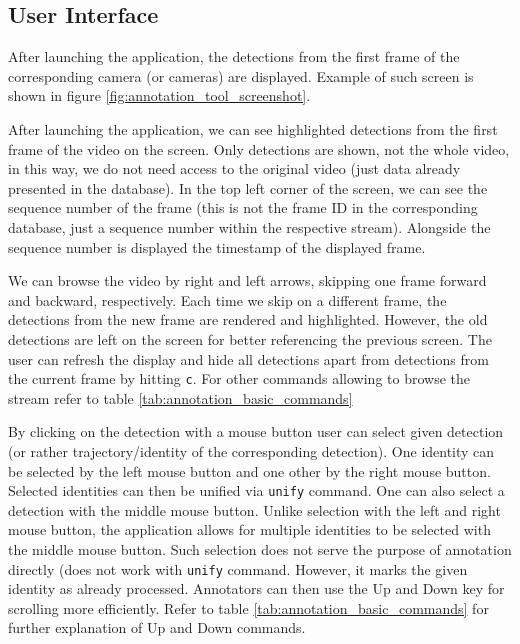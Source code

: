 \subsection{User Interface}

After launching the application, the detections from the first frame of the corresponding
camera (or cameras) are displayed. Example of such screen is shown in figure
\ref{fig:annotation_tool_screenshot}.


After launching the application, we can see highlighted detections from
the first frame of the video on the screen.
Only detections are shown, not the whole video, in this way, we do not need access
to the original video (just data already presented in the database). In the top left corner
of the screen, we can see the sequence number of the frame (this is not the frame ID
in the corresponding database, just a sequence number within the respective stream). Alongside
the sequence number is displayed the timestamp of the displayed frame.

We can browse the video by right and left arrows, skipping one frame forward and
backward, respectively. Each time we skip on a different frame, the detections from
the new frame are rendered and highlighted. However, the old detections are left
on the screen for better referencing the previous screen. The user can refresh the display
and hide all detections apart from detections from the current frame by hitting \verb+c+.
For other commands allowing to browse the stream refer to table
\ref{tab:annotation_basic_commands}

By clicking on the detection with a mouse button user can select given detection (or rather trajectory/identity of the corresponding detection). One identity can be selected
by the left mouse button and one other by the right mouse button. Selected identities can then be unified via \verb+unify+ command. One can also select a detection with the
middle mouse button. Unlike selection with the left and right mouse button, the application
allows for multiple identities to be selected with the middle mouse button. Such selection
does not serve the purpose of annotation directly (does not work with \verb+unify+ command.
However, it marks the given identity as already processed. Annotators can then use the Up and Down key for scrolling more efficiently. Refer to table 
\ref{tab:annotation_basic_commands} for further explanation of Up and Down commands.

